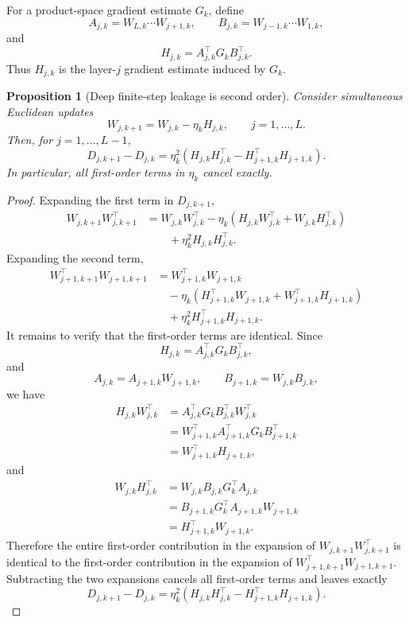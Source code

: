 \documentclass{article}
\newtheorem{proposition}{Proposition}
\begin{document}
For a product-space gradient estimate \(G_k\), define
\[
    A_{j,k}=W_{L,k}\cdots W_{j+1,k},
    \qquad
    B_{j,k}=W_{j-1,k}\cdots W_{1,k},
\]
and
\[
    H_{j,k}
    =
    A_{j,k}^\top G_k B_{j,k}^\top.
\]
Thus \(H_{j,k}\) is the layer-\(j\) gradient estimate induced by \(G_k\).

\begin{proposition}[Deep finite-step leakage is second order]
Consider simultaneous Euclidean updates
\[
    W_{j,k+1}=W_{j,k}-\eta_k H_{j,k},
    \qquad
    j=1,\ldots,L.
\]
Then, for \(j=1,\ldots,L-1\),
\[
    D_{j,k+1}-D_{j,k}
    =
    \eta_k^2
    \left(
        H_{j,k}H_{j,k}^\top
        -
        H_{j+1,k}^\top H_{j+1,k}
    \right).
\]
In particular, all first-order terms in \(\eta_k\) cancel exactly.
\end{proposition}

\begin{proof}
Expanding the first term in \(D_{j,k+1}\),
\[
\begin{aligned}
    W_{j,k+1}W_{j,k+1}^\top
    &=
    W_{j,k}W_{j,k}^\top
    -
    \eta_k
    \left(
        H_{j,k}W_{j,k}^\top
        +
        W_{j,k}H_{j,k}^\top
    \right)  \\
    &\qquad
    +
    \eta_k^2H_{j,k}H_{j,k}^\top .
\end{aligned}
\]
Expanding the second term,
\[
\begin{aligned}
    W_{j+1,k+1}^\top W_{j+1,k+1}
    &=
    W_{j+1,k}^\top W_{j+1,k} \\
    &\quad
    -
    \eta_k
    \left(
        H_{j+1,k}^\top W_{j+1,k}
        +
        W_{j+1,k}^\top H_{j+1,k}
    \right)  \\
    &\quad
    +
    \eta_k^2H_{j+1,k}^\top H_{j+1,k}.
\end{aligned}
\]
It remains to verify that the first-order terms are identical.  Since
\[
    H_{j,k}
    =
    A_{j,k}^\top G_kB_{j,k}^\top,
\]
and
\[
    A_{j,k}=A_{j+1,k}W_{j+1,k},
    \qquad
    B_{j+1,k}=W_{j,k}B_{j,k},
\]
we have
\[
\begin{aligned}
    H_{j,k}W_{j,k}^\top
    &=
    A_{j,k}^\top G_kB_{j,k}^\top W_{j,k}^\top \\
    &=
    W_{j+1,k}^\top A_{j+1,k}^\top G_kB_{j+1,k}^\top \\
    &=
    W_{j+1,k}^\top H_{j+1,k},
\end{aligned}
\]
and
\[
\begin{aligned}
    W_{j,k}H_{j,k}^\top
    &=
    W_{j,k}B_{j,k}G_k^\top A_{j,k} \\
    &=
    B_{j+1,k}G_k^\top A_{j+1,k}W_{j+1,k} \\
    &=
    H_{j+1,k}^\top W_{j+1,k}.
\end{aligned}
\]
Therefore the entire first-order contribution in the expansion of
\(W_{j,k+1}W_{j,k+1}^\top\) is identical to the first-order contribution
in the expansion of \(W_{j+1,k+1}^\top W_{j+1,k+1}\).  Subtracting the
two expansions cancels all first-order terms and leaves exactly
\[
    D_{j,k+1}-D_{j,k}
    =
    \eta_k^2
    \left(
        H_{j,k}H_{j,k}^\top
        -
        H_{j+1,k}^\top H_{j+1,k}
    \right).
\]
\end{proof}
\end{document}
